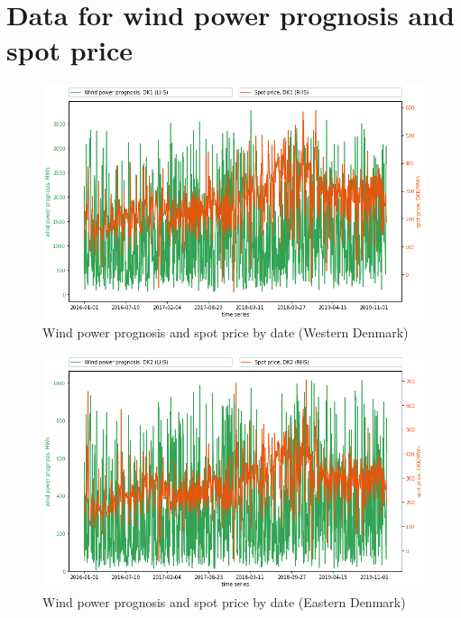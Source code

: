 \section{Data for wind power prognosis and spot price}
\label{app:data}

\begin{figure}[H]
  \centering
  \caption{Wind power prognosis and spot price by date (Western Denmark)}
  \label{fig:wp_dk1_time_series}
    \includegraphics[width=1 \textwidth]{03_figures/wp_dk1_time series}
\end{figure}

\begin{figure}[H]
  \centering
  \caption{Wind power prognosis and spot price by date (Eastern Denmark)}
  \label{fig:wp_dk2_time_series}
    \includegraphics[width=1 \textwidth]{03_figures/wp_dk2_time series}
\end{figure}


